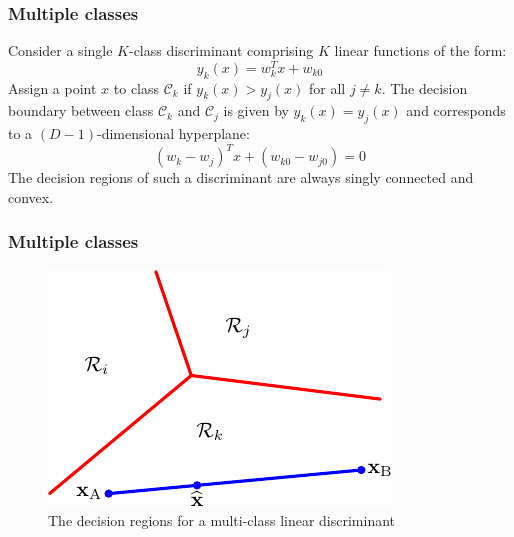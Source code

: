 \documentclass{beamer}
\begin{document}
\begin{frame}
    \frametitle{Multiple classes}
    Consider a single $K$-class discriminant comprising $K$ linear functions of the form:
    \begin{equation*}
        y_k(x)=w_{k}^{T}x+w_{k0}
    \end{equation*}
    Assign a point $x$ to class $\mathcal{C}_{k}$ if $y_k(x)>y_j(x)$ for all $j\ne{}k$. The decision boundary between class $\mathcal{C}_{k}$ and $\mathcal{C}_{j}$ is given by $y_k(x)=y_j(x)$ and corresponds to a $(D-1)$-dimensional hyperplane:
    \begin{equation*}
        (w_{k}-w_{j})^{T}x+(w_{k0}-w_{j0})=0
    \end{equation*}
    The decision regions of such a discriminant are always singly connected and convex.
\end{frame}

\begin{frame}
    \frametitle{Multiple classes}
    \begin{figure}
        \caption{The decision regions for a multi-class linear discriminant}
        \includegraphics{Figure_3.pdf}
    \end{figure}
\end{frame}
\end{document}
